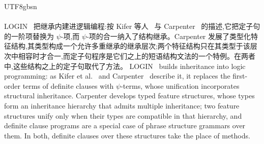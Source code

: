 \begin{CJK*}{UTF8}{gbsn}
\paragraph{}
\ifPaperChinese
LOGIN~\cite{ait-kaci1986-login} 把继承内建进逻辑编程:按 Kifer 等人~\cite{kifer1995-frame-logic} 与 Carpenter~\cite{carpenter1992-typed-feature-structures} 的描述,它把定子句的一阶项替换为 $\psi$-项,而 $\psi$-项的合一纳入了结构继承。Carpenter 发展了类型化特征结构,其类型构成一个允许多重继承的继承层次;两个特征结构只在其类型于该层次中相容时才合一,而定子句程序是它们之上的短语结构文法的一个特例。在两者中,这些结构之上的定子句取代了方法。
\else
LOGIN~\cite{ait-kaci1986-login} builds inheritance into logic
programming: as Kifer et al.~\cite{kifer1995-frame-logic} and
Carpenter~\cite{carpenter1992-typed-feature-structures} describe it,
it replaces the first-order terms of definite clauses with
$\psi$-terms, whose unification incorporates structural inheritance.
Carpenter develops typed feature structures, whose types form an
inheritance hierarchy that admits multiple inheritance; two feature
structures unify only when their types are compatible in that
hierarchy, and definite clause programs are a special case of phrase
structure grammars over them.
In both, definite clauses over these structures take the place of
methods.
\fi

\subsection{}


\end{CJK*}
